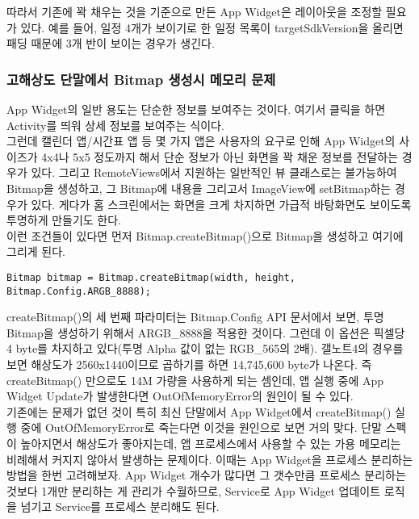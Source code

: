 따라서 기존에 꽉 채우는 것을 기준으로 만든 App Widget은 레이아웃을 조정할 필요가 있다. 예를 들어, 일정 4개가 보이기로 한 일정 목록이 targetSdkVersion을 올리면 패딩 때문에 3개 반이 보이는 경우가 생긴다.

\subsubsection{고해상도 단말에서 Bitmap 생성시 메모리 문제}
App Widget의 일반 용도는 단순한 정보를 보여주는 것이다. 여기서 클릭을 하면 Activity를 띄워 상세 정보를 보여주는 식이다.\\

그런데 캘린더 앱/시간표 앱 등 몇 가지 앱은 사용자의 요구로 인해 App Widget의 사이즈가 4x4나 5x5 정도까지 해서 단순 정보가 아닌 화면을 꽉 채운 정보를 전달하는 경우가 있다.
그리고 RemoteViews에서 지원하는 일반적인 뷰 클래스로는 불가능하여 Bitmap을 생성하고, 그 Bitmap에 내용을 그리고서 ImageView에 setBitmap하는 경우가 있다.
게다가 홈 스크린에서는 화면을 크게 차지하면 가급적 바탕화면도 보이도록 투명하게 만들기도 한다.\\

이런 조건들이 있다면 먼저 Bitmap.createBitmap()으로 Bitmap을 생성하고 여기에 그리게 된다.
\begin{verbatim}
Bitmap bitmap = Bitmap.createBitmap(width, height, Bitmap.Config.ARGB_8888); 
\end{verbatim}
createBitmap()의 세 번째 파라미터는 Bitmap.Config API 문서에서 보면, 투명 Bitmap을 생성하기 위해서 ARGB\_8888을 적용한 것이다.
그런데 이 옵션은 픽셀당 4 byte를 차지하고 있다(투명 Alpha 값이 없는 RGB\_565의 2배). 갤노트4의 경우를 보면 해상도가 2560x1440이므로 곱하기를 하면 14,745,600 byte가 나온다. 즉 createBitmap() 만으로도 14M 가량을 사용하게 되는 셈인데, 앱 실행 중에 App Widget Update가 발생한다면 OutOfMemoryError의 원인이 될 수 있다.\\

기존에는 문제가 없던 것이 특히 최신 단말에서 App Widget에서 createBitmap() 실행 중에 OutOfMemoryError로 죽는다면 이것을 원인으로 보면 거의 맞다.
단말 스펙이 높아지면서 해상도가 좋아지는데, 앱 프로세스에서 사용할 수 있는 가용 메모리는 비례해서 커지지 않아서 발생하는 문제이다.
이때는 App Widget을 프로세스 분리하는 방법을 한번 고려해보자.
App Widget 개수가 많다면 그 갯수만큼 프로세스 분리하는 것보다 1개만 분리하는 게 관리가 수월하므로, Service로 App Widget 업데이트 로직을 넘기고 Service를 프로세스 분리해도 된다.
